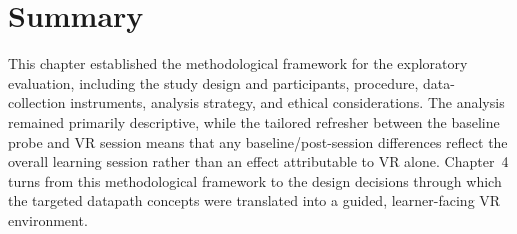 \section{Summary}

This chapter established the methodological framework for the exploratory evaluation, including the study design and participants, procedure, data-collection instruments, analysis strategy, and ethical considerations. The analysis remained primarily descriptive, while the tailored refresher between the baseline probe and VR session means that any baseline/post-session differences reflect the overall learning session rather than an effect attributable to VR alone. Chapter~4 turns from this methodological framework to the design decisions through which the targeted datapath concepts were translated into a guided, learner-facing VR environment.